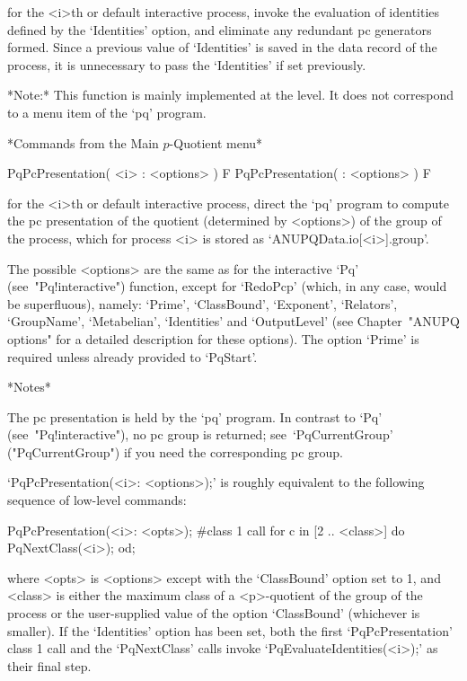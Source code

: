 for the  <i>th  or  default  interactive  {\ANUPQ}  process,  invoke  the
evaluation  of  identities  defined  by  the  `Identities'  option,   and
eliminate any redundant pc generators formed. Since a previous  value  of
`Identities'  is  saved  in  the  data  record  of  the  process,  it  is
unnecessary to pass the `Identities' if set previously.

*Note:* This function is mainly implemented at the {\GAP} level. It  does
not correspond to a menu item of the `pq' program.

\goodbreak%
*Commands from the Main $p$-Quotient menu*

\>PqPcPresentation( <i> : <options> ) F
\>PqPcPresentation( : <options> ) F

for the <i>th or default interactive {\ANUPQ} process,  direct  the  `pq'
program to compute the pc presentation of  the  quotient  (determined  by
<options>) of the group of the process, which for process <i>  is  stored
as `ANUPQData.io[<i>].group'.

The  possible  <options>  are  the  same  as  for  the  interactive  `Pq'
(see~"Pq!interactive") function, except  for  `RedoPcp'  (which,  in  any
case, would be superfluous), namely: `Prime',  `ClassBound',  `Exponent',
`Relators', `GroupName',  `Metabelian',  `Identities'  and  `OutputLevel'
(see  Chapter~"ANUPQ  options"  for  a  detailed  description  for  these
options). The option `Prime'  is  required  unless  already  provided  to
`PqStart'.

*Notes* 

The pc presentation is held by the `pq'  program.  In  contrast  to  `Pq'
(see~"Pq!interactive"),    no    {\GAP}    pc    group    is    returned;
see~`PqCurrentGroup' ("PqCurrentGroup") if  you  need  the  corresponding
{\GAP} pc group.

`PqPcPresentation(<i>:  <options>);'  is  roughly   equivalent   to   the
following sequence of low-level commands:

PqPcPresentation(<i>: <opts>); \#class 1 call
for c in [2 .. <class>] do
PqNextClass(<i>);
od;

where <opts> is <options> except with the `ClassBound' option set  to  1,
and <class> is either the maximum class of a <p>-quotient of the group of
the process  or  the  user-supplied  value  of  the  option  `ClassBound'
(whichever is smaller). If the `Identities' option has been set, both the
first `PqPcPresentation' class 1 call and the `PqNextClass' calls  invoke
`PqEvaluateIdentities(<i>);' as their final step.

